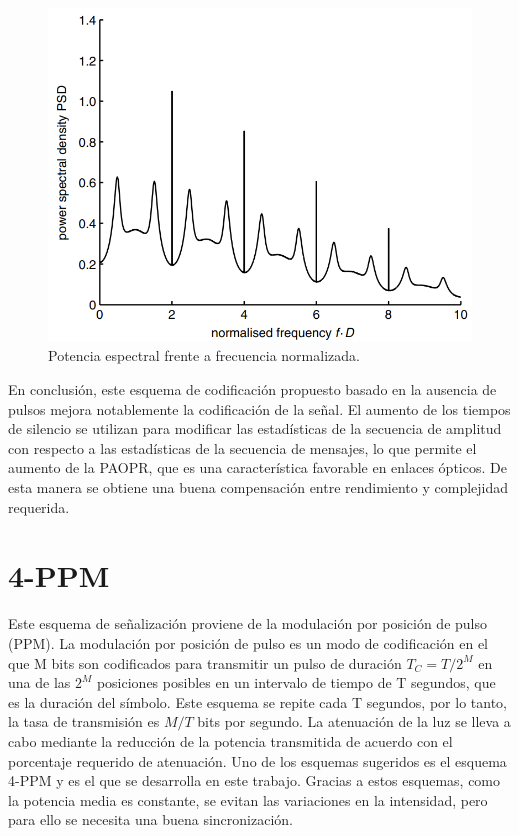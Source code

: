\begin{figure}[ht]
    \centering
    \includegraphics[scale=0.5]{./figuras/psd_cancelacion.png}
    \caption{\small{Potencia espectral frente a frecuencia normalizada.}}
    \label{psd_cancelación}%
\end{figure}


En conclusión, este esquema de codificación propuesto basado en la ausencia de pulsos
mejora notablemente la codificación de la señal.
El aumento de los tiempos de silencio se utilizan para modificar las estadísticas de
la secuencia de amplitud con respecto a las estadísticas de la
secuencia de mensajes, lo que permite el aumento de la PAOPR,
que es una característica favorable en enlaces ópticos. De esta manera se 
obtiene una buena compensación entre rendimiento y complejidad requerida.

\section{4-PPM}
Este esquema de señalización 
proviene de la modulación por posición de pulso (PPM).
La modulación por posición de pulso es un modo de codificación en el que M bits son 
codificados para transmitir un pulso de duración $ T_C = T/2^M $ en una de las $ 2^M $ 
posiciones posibles en un intervalo de tiempo de T segundos, que es la duración del símbolo.
Este esquema se repite cada T segundos, por lo tanto, la tasa de transmisión es $M/T$ bits 
por segundo. La
atenuación de la luz se lleva a cabo mediante la reducción de la potencia transmitida de 
acuerdo con el
porcentaje requerido de atenuación.
Uno de los esquemas sugeridos es el esquema 4-PPM y es el que se desarrolla en este trabajo.
Gracias a estos esquemas, como la potencia media es constante, se evitan las variaciones 
en la intensidad, pero para ello se necesita una buena sincronización.


